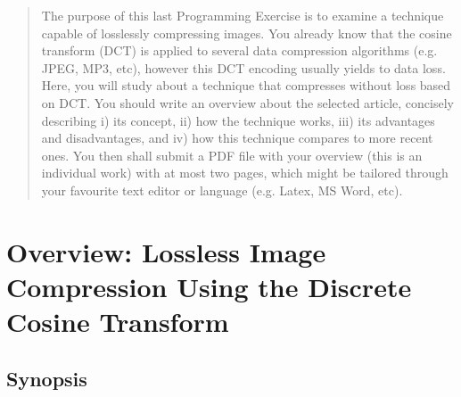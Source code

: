 \documentclass[10pt, twoside, twocolumn]{paper} %
\begin{document}
\thispagestyle{empty}


\iftwocolumn
\fi

\begin{quote}
  The purpose of this last Programming Exercise is to examine a technique capable of losslessly compressing images. You already know that the cosine transform (DCT) is applied to several data compression algorithms (e.g. JPEG, MP3, etc), however this DCT encoding usually yields to data loss. Here, you will study about a technique that compresses without loss based on DCT. You should write an overview about the selected article, concisely describing i) its concept, ii) how the technique works, iii) its advantages and disadvantages, and iv) how this technique compares to more recent ones. You then shall submit a PDF file with your overview (this is an individual work) with at most two pages, which might be tailored through your favourite text editor or language (e.g. Latex, MS Word, etc).
\end{quote}

\section*{Overview: Lossless Image Compression Using the Discrete Cosine Transform}

\subsection*{Synopsis}
\end{document}
